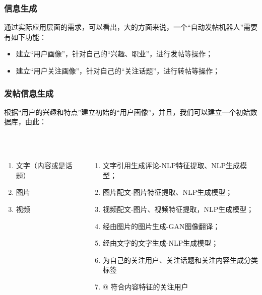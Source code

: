 \documentclass[../Postbot.tex]{subfiles}
\begin{document}
    \begin{frame}
        \frametitle{信息生成}
        通过实际应用层面的需求，可以看出，大的方面来说，一个“自动发帖机器人”需要有如下功能： \\
        \begin{itemize}
            \item 建立“用户画像”，针对自己的“兴趣、职业”，进行发帖等操作；
            \item 建立“用户关注画像”，针对自己的“关注话题”，进行转帖等操作；
        \end{itemize}
    \end{frame}

    \begin{frame}
        \frametitle{发帖信息生成}
        \centering
        根据“用户的兴趣和特点”建立初始的“用户画像”，并且，我们可以建立一个初始数据库，由此：\\
        \hspace*{\fill}\\
        \hspace*{\fill}\\
        \begin{columns}
            \begin{column}{.3\textwidth}
                \centering
                \begin{enumerate}
                    \item 文字（内容或是话题）
                    \item 图片
                    \item 视频
                \end{enumerate}
            \end{column}
            \begin{column}{.7\textwidth}
                \begin{enumerate}
                    \item 文字引用生成评论-NLP特征提取、NLP生成模型； \\
                    \item 图片配文-图片特征提取、NLP生成模型； \\
                    \item 视频配文-图片、视频特征提取，NLP生成模型； \\
                    \item 经由图片的图片生成-GAN图像翻译； \\
                    \item 经由文字的文字生成-NLP生成模型； \\
                    \item 为自己的关注用户、关注话题和关注内容生成分类标签 \\
                    \item @ 符合内容特征的关注用户 \\
                \end{enumerate}
            \end{column}
        \end{columns}
    \end{frame}
\end{document}
